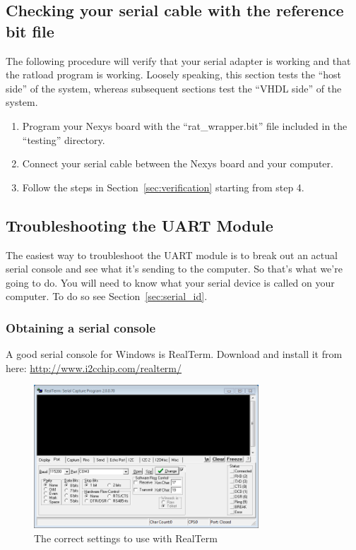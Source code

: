 \documentclass[notitlepage]{article}
\begin{document}
\subsection{Checking your serial cable with the reference bit file}
The following procedure will verify that your serial adapter is working and that the ratload program is working. Loosely speaking, this section tests the ``host side'' of the system, whereas subsequent sections test the ``VHDL side'' of the system.

\begin{enumerate}
\item Program your Nexys board with the ``rat\_wrapper.bit'' file included in the ``testing'' directory.
\item Connect your serial cable between the Nexys board and your computer.
\item Follow the steps in Section~\ref{sec:verification} starting from step 4.
\end{enumerate}

\subsection{Troubleshooting the UART Module}
The easiest way to troubleshoot the UART module is to break out an actual serial console and see what it's sending to the computer. So that's what we're going to do. You will need to know what your serial device is called on your computer. To do so see Section~\ref{sec:serial_id}.
\subsubsection{Obtaining a serial console}
A good serial console for Windows is RealTerm. Download and install it from here: \url{http://www.i2cchip.com/realterm/}

\begin{figure}[ht!]
  \centering
  \includegraphics[width=0.75\textwidth]{fig0.png}
  \caption{The correct settings to use with RealTerm}
  \label{fig:realterm}
\end{figure}
\end{document}
